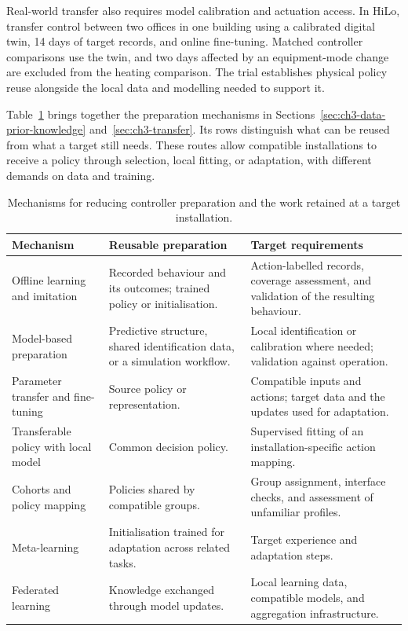 Real-world transfer also requires model calibration and actuation access. In HiLo, \textcite{coraci2025hilo} transfer control between two offices in one building using a calibrated digital twin, 14 days of target records, and online fine-tuning. Matched controller comparisons use the twin, and two days affected by an equipment-mode change are excluded from the heating comparison. The trial establishes physical policy reuse alongside the local data and modelling needed to support it.

Table~\ref{tab:ch3-deployability-methods} brings together the preparation mechanisms in Sections~\ref{sec:ch3-data-prior-knowledge} and~\ref{sec:ch3-transfer}. Its rows distinguish what can be reused from what a target still needs. These routes allow compatible installations to receive a policy through selection, local fitting, or adaptation, with different demands on data and training.

\begin{table}[!htbp]
\centering
\caption{Mechanisms for reducing controller preparation and the work retained at a target installation.}
\label{tab:ch3-deployability-methods}
\small
\setlength{\tabcolsep}{4pt}
\renewcommand{\arraystretch}{1.12}
\begin{tabularx}{\textwidth}{@{}>{\raggedright\arraybackslash}p{}>{\raggedright\arraybackslash}X>{\raggedright\arraybackslash}X@{}}
\toprule
Mechanism & Reusable preparation & Target requirements\\
\midrule
Offline learning and imitation & Recorded behaviour and its outcomes; trained policy or initialisation. & Action-labelled records, coverage assessment, and validation of the resulting behaviour.\\
\addlinespace
Model-based preparation & Predictive structure, shared identification data, or a simulation workflow. & Local identification or calibration where needed; validation against operation.\\
\addlinespace
Parameter transfer and fine-tuning & Source policy or representation. & Compatible inputs and actions; target data and the updates used for adaptation.\\
\addlinespace
Transferable policy with local model & Common decision policy. & Supervised fitting of an installation-specific action mapping.\\
\addlinespace
Cohorts and policy mapping & Policies shared by compatible groups. & Group assignment, interface checks, and assessment of unfamiliar profiles.\\
\addlinespace
Meta-learning & Initialisation trained for adaptation across related tasks. & Target experience and adaptation steps.\\
\addlinespace
Federated learning & Knowledge exchanged through model updates. & Local learning data, compatible models, and aggregation infrastructure.\\
\bottomrule
\end{tabularx}
\end{table}

